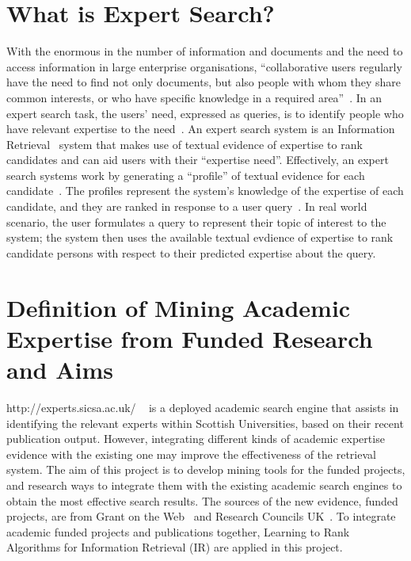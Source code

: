 \section{What is Expert Search?}\label{sec:expertsearch}
With the enormous in the number of information and documents and the need to access information in large enterprise organisations,
``collaborative users regularly have the need to find not only documents, but also people with whom they share common interests, 
or who have specific knowledge in a required area''~\cite[P. 388]{expertsearch}. In an expert search task,
the users' need, expressed as queries, is to identify people who have relevant expertise to the need~\cite[P. 387]{expertsearch}.
An expert search system is an Information Retrieval~\cite{IR} system that makes use of textual evidence 
of expertise to rank candidates and can aid users with their ``expertise need''. Effectively, an expert search systems work by generating a ``profile'' 
of textual evidence for each candidate~\cite[P. 388]{expertsearch}. The profiles represent the system's knowledge of the expertise of each 
candidate, and they are ranked in response to a user query~\cite[P. 388]{expertsearch}. In real world scenario, the user formulates a query to 
represent their topic of interest to the system; the system then uses the available textual evdience of expertise to rank candidate persons with 
respect to their predicted expertise about the query.

\section{Definition of Mining Academic Expertise from Funded Research and Aims}\label{section:aims}
http://experts.sicsa.ac.uk/ ~\cite{sicsasearch} is a deployed academic search engine that assists in identifying the relevant experts within Scottish Universities, 
based on their recent publication output. However, integrating different kinds of academic expertise evidence with the existing one may improve
the effectiveness of the retrieval system. The aim of this project is to develop mining tools for the funded projects, 
and research ways to integrate them with the existing academic search engines to obtain the most effective search results. 
The sources of the new evidence, funded projects, are from Grant on the Web~\cite{gow} and Research Councils UK~\cite{gtr}.
To integrate academic funded projects and publications together, Learning to Rank Algorithms for Information Retrieval (IR) are applied in this project.

